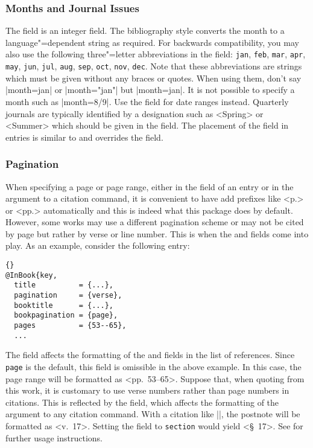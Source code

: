 \documentclass{ltxdockit}[2011/03/25]
\newcommand*{\biblatex}{\sty{biblatex}\xspace}
\begin{document}
\subsubsection{Months and Journal Issues}
\label{bib:use:iss}

The  field is an integer field. The bibliography style converts the month to a language"=dependent string as required. For backwards compatibility, you may also use the following three"=letter abbreviations in the  field: \texttt{jan}, \texttt{feb}, \texttt{mar}, \texttt{apr}, \texttt{may}, \texttt{jun}, \texttt{jul}, \texttt{aug}, \texttt{sep}, \texttt{oct}, \texttt{nov}, \texttt{dec}. Note that these abbreviations are \bibtex strings which must be given without any braces or quotes. When using them, don't say |month={jan}| or |month="jan"| but |month=jan|. It is not possible to specify a month such as |month={8/9}|. Use the  field for date ranges instead. Quarterly journals are typically identified by a designation such as <Spring> or <Summer> which should be given in the  field. The placement of the  field in  entries is similar to and overrides the  field.

\subsubsection{Pagination}
\label{bib:use:pag}

When specifying a page or page range, either in the  field of an entry or in the  argument to a citation command, it is convenient to have \biblatex add prefixes like <p.> or <pp.> automatically and this is indeed what this package does by default. However, some works may use a different pagination scheme or may not be cited by page but rather by verse or line number. This is when the  and  fields come into play. As an example, consider the following entry:

\begin{lstlisting}[style=bibtex]{}
@InBook{key,
  title          = {...},
  pagination     = {verse},
  booktitle      = {...},
  bookpagination = {page},
  pages          = {53--65},
  ...
\end{lstlisting}
%
The  field affects the formatting of the  and  fields in the list of references. Since \texttt{page} is the default, this field is omissible in the above example. In this case, the page range will be formatted as <pp.~53--65>. Suppose that, when quoting from this work, it is customary to use verse numbers rather than page numbers in citations. This is reflected by the  field, which affects the formatting of the  argument to any citation command. With a citation like |\cite[17]{key}|, the postnote will be formatted as <v.~17>. Setting the  field to \texttt{section} would yield <\S~17>. See  for further usage instructions.
\end{document}
